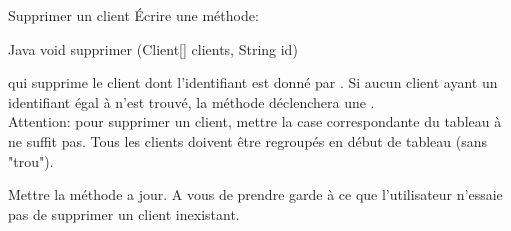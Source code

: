 \documentclass[a4paper,11pt]{article}
\begin{document}
\begin{Exercice}{Supprimer un client}
		\'Ecrire une m\'ethode:
				
		\begin{Code}{Java}
		void supprimer (Client[] clients, String id)
		\end{Code}

qui supprime le client dont l'identifiant est donn\'e par . Si aucun client ayant un identifiant \'egal \`a  n'est trouv\'e, la m\'ethode d\'eclenchera une . \\

Attention: pour supprimer un client, mettre la case correspondante du tableau \`a  ne suffit pas. Tous les clients doivent \^etre regroup\'es en d\'ebut de tableau (sans "trou").


Mettre la m\'ethode  a jour. A vous de prendre garde \`a ce que l'utilisateur n'essaie pas de supprimer un client inexistant.
	
\end{Exercice}

	
	
\end{document}
